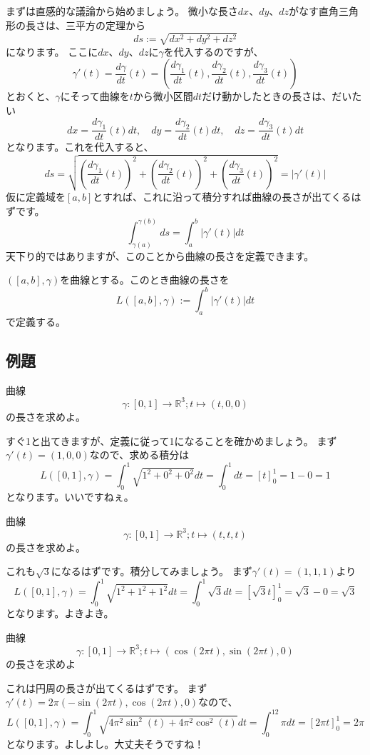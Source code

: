 まずは直感的な議論から始めましょう。
微小な長さ$dx$、$dy$、$dz$がなす直角三角形の長さは、三平方の定理から
\[
  ds:=\sqrt{dx^2+dy^2+dz^2}
\]
になります。
ここに$dx$、$dy$、$dz$に$\gamma$を代入するのですが、
\[
  \gamma'(t)=\frac{d\gamma}{dt}(t)=\left(\frac{d\gamma_1}{dt}(t),\frac{d\gamma_2}{dt}(t),\frac{d\gamma_3}{dt}(t)\right)
\]
とおくと、$\gamma$にそって曲線を$t$から微小区間$dt$だけ動かしたときの長さは、だいたい
\[
  dx=\frac{d\gamma_1}{dt}(t)dt,\quad dy=\frac{d\gamma_2}{dt}(t)dt,\quad dz=\frac{d\gamma_3}{dt}(t)dt
\]
となります。これを代入すると、
\[
  ds=\sqrt{\left(\frac{d\gamma_1}{dt}(t)\right)^2+\left(\frac{d\gamma_2}{dt}(t)\right)^2+\left(\frac{d\gamma_3}{dt}(t)\right)^2}=|\gamma'(t)|
\]
仮に定義域を$[a,b]$とすれば、これに沿って積分すれば曲線の長さが出てくるはずです。
\[
  \int_{\gamma(a)}^{\gamma(b)}ds=\int_a^b|\gamma'(t)|dt
\]
天下り的ではありますが、このことから曲線の長さを定義できます。
\begin{definition}
  $([a,b],\gamma)$を曲線とする。このとき曲線の長さを
  \[
    L([a,b],\gamma):=\int_a^b|\gamma'(t)|dt
  \]
  で定義する。
\end{definition}

\subsection{例題}

\begin{example}
  曲線
  \[
    \gamma:[0,1]\to\mathbb{R}^3;t\mapsto(t,0,0)
  \]
  の長さを求めよ。
\end{example}
すぐ1と出てきますが、定義に従って1になることを確かめましょう。
まず$\gamma'(t)=(1,0,0)$なので、求める積分は
\[
  L([0,1],\gamma)=\int_0^1\sqrt{1^2+0^2+0^2}dt=\int_0^1dt=[t]_0^1=1-0=1
\]
となります。いいですねぇ。

\begin{example}
  曲線
  \[
    \gamma:[0,1]\to\mathbb{R}^3;t\mapsto(t,t,t)
  \]
  の長さを求めよ。
\end{example}
これも$\sqrt{3}$になるはずです。積分してみましょう。
まず$\gamma'(t)=(1,1,1)$より
\[
  L([0,1],\gamma)=\int_0^1\sqrt{1^2+1^2+1^2}dt=\int_0^1\sqrt{3}dt=[\sqrt{3}t]_0^1=\sqrt{3}-0=\sqrt{3}
\]
となります。よきよき。

\begin{example}
  曲線
  \[
    \gamma:[0,1]\to\mathbb{R}^3;t\mapsto(\cos(2\pi t),\sin(2\pi t),0)
  \]
  の長さを求めよ
\end{example}
これは円周の長さが出てくるはずです。
まず$\gamma'(t)=2\pi(-\sin(2\pi t),\cos(2\pi t),0)$なので、
\[
  L([0,1],\gamma)=\int_0^1\sqrt{4\pi^2\sin^2(t)+4\pi^2\cos^2(t)}dt=\int_0^12\pi dt=[2\pi t]_0^1=2\pi
\]
となります。よしよし。大丈夫そうですね！

